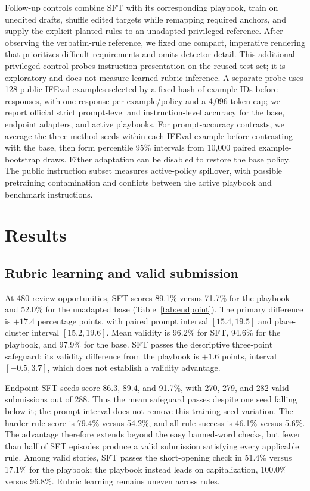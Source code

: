 \documentclass[10pt,twocolumn,letterpaper]{article}
\newcommand{\claim}[2]{#2}
\begin{document}
\claim{C50}{Follow-up controls combine SFT with its corresponding playbook, train on unedited drafts, shuffle edited targets while remapping required anchors, and supply the explicit planted rules to an unadapted privileged reference.}
\claim{C54}{After observing the verbatim-rule reference, we fixed one compact, imperative rendering that prioritizes difficult requirements and omits detector detail. This additional privileged control probes instruction presentation on the reused test set; it is exploratory and does not measure learned rubric inference.}
\claim{C51}{A separate probe uses 128 public IFEval examples selected by a fixed hash of example IDs before responses, with one response per example/policy and a 4,096-token cap; we report official strict prompt-level and instruction-level accuracy for the base, endpoint adapters, and active playbooks.}
\claim{C56}{For prompt-accuracy contrasts, we average the three method seeds within each IFEval example before contrasting with the base, then form percentile 95\% intervals from 10,000 paired example-bootstrap draws.}
\claim{C52}{Either adaptation can be disabled to restore the base policy. The public instruction subset measures active-policy spillover, with possible pretraining contamination and conflicts between the active playbook and benchmark instructions.}

\section{Results}
\subsection{Rubric learning and valid submission}
\claim{C60}{At 480 review opportunities, SFT scores 89.1\% versus 71.7\% for the playbook and 52.0\% for the unadapted base (Table~\ref{tab:endpoint}). The primary difference is $+17.4$ percentage points, with paired prompt interval $[15.4,19.5]$ and place-cluster interval $[15.2,19.6]$.}
\claim{C61}{Mean validity is 96.2\% for SFT, 94.6\% for the playbook, and 97.9\% for the base. SFT passes the descriptive three-point safeguard; its validity difference from the playbook is $+1.6$ points, interval $[-0.5,3.7]$, which does not establish a validity advantage.}

\claim{C62}{Endpoint SFT seeds score 86.3, 89.4, and 91.7\%, with 270, 279, and 282 valid submissions out of 288. Thus the mean safeguard passes despite one seed falling below it; the prompt interval does not remove this training-seed variation.}
\claim{C63}{The harder-rule score is 79.4\% versus 54.2\%, and all-rule success is 46.1\% versus 5.6\%. The advantage therefore extends beyond the easy banned-word checks, but fewer than half of SFT episodes produce a valid submission satisfying every applicable rule.}
\claim{C64}{Among valid stories, SFT passes the short-opening check in 51.4\% versus 17.1\% for the playbook; the playbook instead leads on capitalization, 100.0\% versus 96.8\%. Rubric learning remains uneven across rules.}
\end{document}
